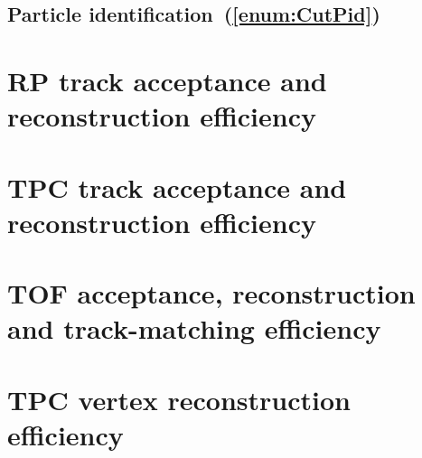 \subsection{Particle identification~(\ref{enum:CutPid})}

\section{RP track acceptance and reconstruction efficiency}\label{sec:rpAccAndEff}
\section{TPC track acceptance and reconstruction efficiency}\label{sec:tpcAccAndEff}
\section{TOF acceptance, reconstruction and track-matching efficiency}\label{sec:tofAccAndEff}
\section{TPC vertex reconstruction efficiency}\label{sec:tpcVxRecoEff}